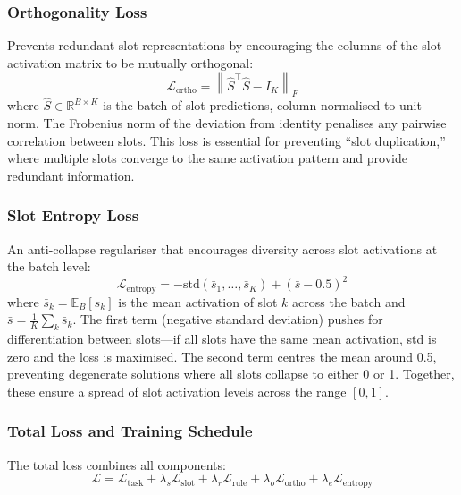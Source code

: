 \documentclass[conference]{IEEEtran}
\newcommand{\Real}{\mathbb{R}}
\begin{document}
\subsubsection{Orthogonality Loss}
Prevents redundant slot representations by encouraging the columns
of the slot activation matrix to be mutually orthogonal:
\begin{equation}
    \mathcal{L}_\text{ortho} = \left\|
    \hat{S}^\top \hat{S} - I_K
    \right\|_F
\end{equation}
where $\hat{S} \in \Real^{B \times K}$ is the batch of slot
predictions, column-normalised to unit norm.  The Frobenius norm
of the deviation from identity penalises any pairwise correlation
between slots.  This loss is essential for preventing
``slot duplication,'' where multiple slots converge to the same
activation pattern and provide redundant information.

\subsubsection{Slot Entropy Loss}
An anti-collapse regulariser that encourages diversity across
slot activations at the batch level:
\begin{equation}
    \mathcal{L}_\text{entropy} = -\mathrm{std}(\bar{s}_1, \dots, \bar{s}_K)
    + (\bar{s} - 0.5)^2
\end{equation}
where $\bar{s}_k = \mathbb{E}_B[s_k]$ is the mean activation of
slot $k$ across the batch and $\bar{s} = \frac{1}{K}\sum_k \bar{s}_k$.
The first term (negative standard deviation) pushes for
differentiation between slots---if all slots have the same mean
activation, std is zero and the loss is maximised.  The second
term centres the mean around 0.5, preventing degenerate solutions
where all slots collapse to either 0 or 1.  Together, these ensure
a spread of slot activation levels across the range $[0, 1]$.

\subsubsection{Total Loss and Training Schedule}
The total loss combines all components:
\begin{equation}
    \mathcal{L} = \mathcal{L}_\text{task}
    + \lambda_s \mathcal{L}_\text{slot}
    + \lambda_r \mathcal{L}_\text{rule}
    + \lambda_o \mathcal{L}_\text{ortho}
    + \lambda_e \mathcal{L}_\text{entropy}
\label{eq:total_loss}
\end{equation}
\end{document}
